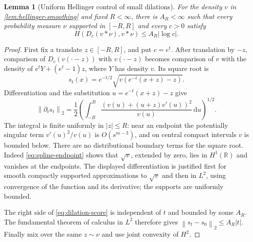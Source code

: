 \documentclass[11pt,a4paper]{article}
\numberwithin{equation}{section}
\newtheorem{lemma}[theorem]{Lemma}
\theoremstyle{definition}
\theoremstyle{remark}
\newcommand{\R}{\mathbb R}
\newcommand{\dd}{\,\mathrm d}
\newcommand{\norm}[1]{\left\lVert #1\right\rVert}
\begin{document}
\begin{lemma}[Uniform Hellinger control of small dilations]
\label{lem:hellinger-dilation}
For the density $v$ in \cref{lem:hellinger-smoothing} and fixed $R<\infty$,
there is $A_R<\infty$ such that every probability measure $\nu$ supported
in $[-R,R]$ and every $c>0$ satisfy
\begin{equation}
 H(D_c(v*\nu),v*\nu)\le A_R|\log c|.
 \label{eq:hellinger-dilation}
\end{equation}
\end{lemma}
\begin{proof}
First fix a translate $z\in[-R,R]$, and put $c=e^t$.
After translation by $-z$, comparison of $D_c(v(\cdot-z))$ with
$v(\cdot-z)$ becomes comparison of $v$ with the density of
$e^tY+(e^t-1)z$, where $Y$ has density $v$. Its square root is
\[
 s_t(x)=e^{-t/2}\sqrt{v(e^{-t}(x+z)-z)}.
\]
Differentiation and the substitution $u=e^{-t}(x+z)-z$ give
\begin{equation}
 \norm{\partial_ts_t}_2
 =\frac12\left(\int_{-B}^B
       \frac{(v(u)+(u+z)v'(u))^2}{v(u)}\dd u\right)^{1/2}.
 \label{eq:dilation-score}
\end{equation}
The integral is finite uniformly in $|z|\le R$: near an endpoint the
potentially singular term $v'(u)^2/v(u)$ is $O(s^{m-3})$, and on central
compact intervals $v$ is bounded below. There are no distributional boundary
terms for the square root. Indeed \eqref{eq:spline-endpoint} shows that
$\sqrt v$, extended by zero, lies in $H^1(\R)$ and vanishes at the endpoints.
The displayed differentiation is justified first for smooth compactly supported
approximations to $\sqrt v$ and then in $L^2$, using convergence of the
function and its derivative; the supports are uniformly bounded.

The right side of \eqref{eq:dilation-score} is independent of $t$ and
bounded by some $A_R$. The fundamental theorem of calculus in $L^2$
therefore gives $\norm{s_t-s_0}_2\le A_R|t|$.
Finally mix over the same $z\sim\nu$ and use joint convexity of $H^2$.
\end{proof}
\end{document}
